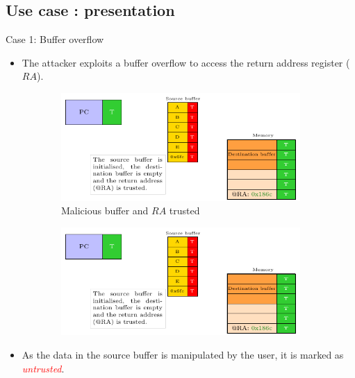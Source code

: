 \subsection{Use case : presentation}
\begin{frame}{Case 1: Buffer overflow}
    \begin{itemize}
        \item The attacker exploits a buffer overflow to access the return address register ($RA$).
    \end{itemize}

    \begin{figure}
        \centering
        \begin{subfigure}[l]{.45\textwidth}
            \centering
            \includegraphics[width=.9\textwidth, page=1]{src/2_vuln_assessment/img/buffer_overflow/schemaPedagogique.pdf}
            \caption{Malicious buffer and $RA$ trusted}
            \label{fig:bo_1st_step}
        \end{subfigure}
        \begin{subfigure}[r]{.45\textwidth}
            \centering
            \includegraphics[width=.9\textwidth, page=2]{src/2_vuln_assessment/img/buffer_overflow/schemaPedagogique.pdf}
            \caption{}
            \label{fig:bo_2_step}
        \end{subfigure}
    \end{figure}

    \begin{itemize}
        \item As the data in the source buffer is manipulated by the user, it is marked as \textcolor{red}{\textit{untrusted}}.
    \end{itemize}
\end{frame}

